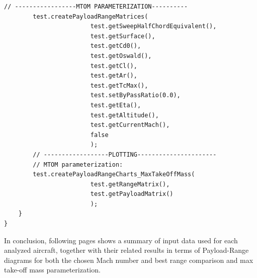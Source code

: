 \documentclass[a4paper,12pt,oneside]{book}
\begin{document}
\bigskip
\begin{lstlisting}[caption={Excerpt of the ATR-72 Payload-Range test - maximum take-off mass parameterization}, captionpos=b, tabsize=2]
		// -----------------MTOM PARAMETERIZATION----------
		test.createPayloadRangeMatrices(
						test.getSweepHalfChordEquivalent(),
						test.getSurface(),
						test.getCd0(),
						test.getOswald(),
						test.getCl(),
						test.getAr(),
						test.getTcMax(),
						test.setByPassRatio(0.0),
						test.getEta(),
						test.getAltitude(),
						test.getCurrentMach(),
						false
						);
		// ------------------PLOTTING----------------------		
		// MTOM parameterization:
		test.createPayloadRangeCharts_MaxTakeOffMass(
						test.getRangeMatrix(),
						test.getPayloadMatrix()
						);
	}
} 
\end{lstlisting}

\bigskip
In conclusion, following pages shows a summary of input data used for each analyzed aircraft, together with their related results in terms of Payload-Range diagrams for both the chosen Mach number and best range comparison and max take-off mass parameterization. 

\begin{figure}
\end{figure}
\end{document}
